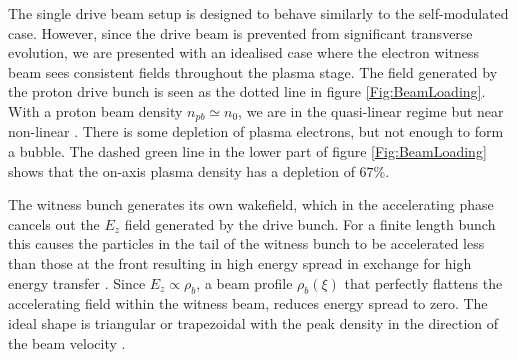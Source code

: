 \documentclass[aps,prstab,reprint,amsmath,amssymb,groupedaddress]{revtex4-1}
\begin{document}

The single drive beam setup is designed to behave similarly to the self-modulated case. However, since the drive beam is
prevented from significant transverse evolution, we are presented with an idealised case where the electron witness beam
sees consistent fields throughout the plasma stage. The field generated by the proton drive bunch is seen as the dotted
line in figure \ref{Fig:BeamLoading}. With a proton beam density $n_{pb} \simeq n_{0}$, we are in the quasi-linear
regime but near non-linear \cite{rosenzweig:2010}. There is some depletion of plasma electrons, but not enough to form a
bubble. The dashed green line in the lower part of figure \ref{Fig:BeamLoading} shows that the on-axis plasma density
has a depletion of $67\%$.


The witness bunch generates its own wakefield, which in the accelerating phase cancels out the $E_{z}$ field generated
by the drive bunch. For a finite length bunch this causes the particles in the tail of the witness bunch to be
accelerated less than those at the front resulting in high energy spread in exchange for high energy transfer
\cite{van_der_meer:1985}. Since $E_{z} \propto \rho_{b}$, a beam profile $\rho_{b}(\xi)$ that perfectly flattens the
accelerating field within the witness beam, reduces energy spread to zero. The ideal shape is triangular or trapezoidal
with the peak density in the direction of the beam velocity \cite{katsouleas:1987, tzoufras:2009}.

\end{document}

